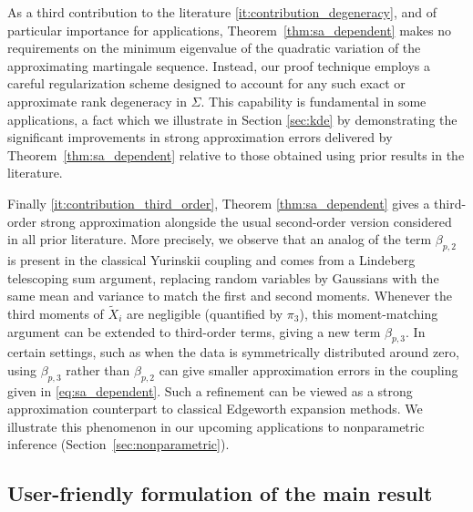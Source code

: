 As a third contribution to the literature \ref{it:contribution_degeneracy}, and
of particular importance for applications, Theorem~\ref{thm:sa_dependent} makes
no requirements on the minimum eigenvalue of the quadratic variation of the
approximating martingale sequence. Instead, our proof technique employs a
careful regularization scheme designed to account for any such exact or
approximate rank degeneracy in $\Sigma$. This capability is fundamental in some
applications, a fact which we illustrate in Section \ref{sec:kde} by
demonstrating the significant improvements in strong approximation errors
delivered by Theorem~\ref{thm:sa_dependent} relative to those obtained using
prior results in the literature.

Finally \ref{it:contribution_third_order},
Theorem \ref{thm:sa_dependent} gives
a third-order strong approximation alongside the usual second-order
version considered in all prior literature.
More precisely, we observe that an analog of the term
$\beta_{p,2}$ is present in the
classical Yurinskii coupling and comes from a Lindeberg
telescoping sum argument,
replacing random variables by Gaussians with the same mean
and variance to match the first and second moments.
Whenever the third moments of $\tilde X_i$ are negligible
(quantified by $\pi_3$), this moment-matching argument can be extended to
third-order terms, giving a new term $\beta_{p,3}$.
In certain settings, such as when the data is symmetrically
distributed around zero, using $\beta_{p,3}$ rather than $\beta_{p,2}$
can give smaller approximation errors in the coupling given in
\eqref{eq:sa_dependent}.
Such a refinement can be viewed as a strong approximation counterpart
to classical Edgeworth expansion methods.
We illustrate this phenomenon in our
upcoming applications to nonparametric inference
(Section~\ref{sec:nonparametric}).

\subsection{User-friendly formulation of the main result}%

